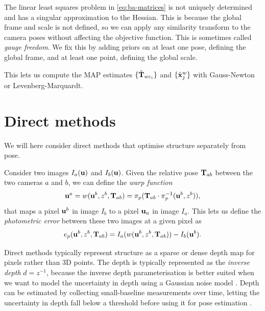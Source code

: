 The linear least squares problem in \eqref{eq:ba-matrices} is not uniquely determined and has a singular approximation to the Hessian.
This is because the global frame and scale is not defined, so we can apply any similarity transform to the camera poses without affecting the objective function.
This is sometimes called \emph{gauge freedom}.
We fix this by adding priors on at least one pose, defining the global frame, and at least one point, defining the global scale.

This lets us compute the MAP estimates $\{\hat{{\boldsymbol{\mathbf{T}}}}_{wc_i}\}$ and $\{\hat{{\boldsymbol{\mathbf{x}}}}^w_j\}$ with Gauss-Newton or Levenberg-Marquardt.


\section{Direct methods} \label{sec:direct-methods}
We will here consider direct methods that optimise structure separately from pose.

Consider two images $I_a({\boldsymbol{\mathbf{u}}})$ and $I_b({\boldsymbol{\mathbf{u}}})$.
Given the relative pose ${\boldsymbol{\mathbf{T}}}_{ab}$ between the two cameras $a$ and $b$, we can define the \emph{warp function} \cite{Baker2004Lucas-KanadeFramework}
\begin{equation}
  {\boldsymbol{\mathbf{u}}}^a = w({\boldsymbol{\mathbf{u}}}^b, z^b, {\boldsymbol{\mathbf{T}}}_{ab}) = \pi_p({\boldsymbol{\mathbf{T}}}_{ab} \cdot  \pi_p^{-1}({\boldsymbol{\mathbf{u}}}^b, z^b)),
\end{equation}
that maps a pixel ${\boldsymbol{\mathbf{u}}}^b$ in image $I_b$ to a pixel ${\boldsymbol{\mathbf{u}}}_a$ in image $I_a$.
This lets us define the \emph{photometric error} between these two images at a given pixel as
\begin{equation} \label{eq:photometric-error}
  e_p({\boldsymbol{\mathbf{u}}}^b, z^b, {\boldsymbol{\mathbf{T}}}_{ab}) = I_a(w({\boldsymbol{\mathbf{u}}}^b, z^b, {\boldsymbol{\mathbf{T}}}_{ab})) - I_b({\boldsymbol{\mathbf{u}}}^b).
\end{equation}

Direct methods typically represent structure as a sparse or dense depth map for pixels rather than 3D points.
The depth is typically represented as the \emph{inverse depth} $d = z^{-1}$, because the inverse depth parameterisation is better suited when we want to model the uncertainty in depth using a Gaussian noise model \cite{Civera2012InverseParametrization}.
Depth can be estimated by collecting small-baseline measurements over time, letting the uncertainty in depth fall below a threshold before using it for pose estimation \cite{Engel2013Semi-denseCamera, Engel2014LSD-SLAM:SLAM, Forster2014SVO:Odometry}.

